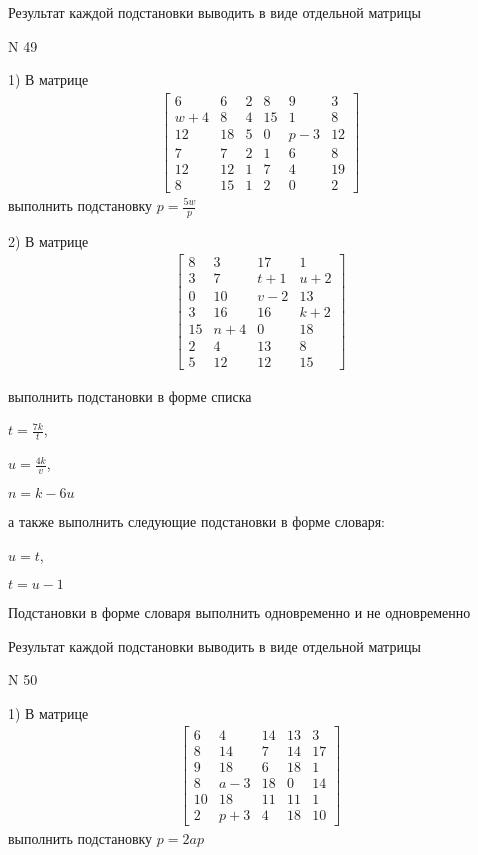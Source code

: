 \documentclass[11pt]{report}
\begin{document}
    Результат каждой подстановки выводить в виде отдельной матрицы

\newpage
N 49


    1) В матрице
\begin{align*}
\left[\begin{matrix}6 & 6 & 2 & 8 & 9 & 3\\w + 4 & 8 & 4 & 15 & 1 & 8\\12 & 18 & 5 & 0 & p - 3 & 12\\7 & 7 & 2 & 1 & 6 & 8\\12 & 12 & 1 & 7 & 4 & 19\\8 & 15 & 1 & 2 & 0 & 2\end{matrix}\right]
\end{align*}
выполнить подстановку $p=\frac{5 w}{p}$


    2) В матрице
\begin{align*}
\left[\begin{matrix}8 & 3 & 17 & 1\\3 & 7 & t + 1 & u + 2\\0 & 10 & v - 2 & 13\\3 & 16 & 16 & k + 2\\15 & n + 4 & 0 & 18\\2 & 4 & 13 & 8\\5 & 12 & 12 & 15\end{matrix}\right]
\end{align*}

выполнить подстановки в форме списка

$t=\frac{7 k}{t}$,

$u=\frac{4 k}{v}$,

$n=k - 6 u$

а также выполнить следующие подстановки в форме словаря:

$u=t$,

$t=u - 1$


    Подстановки в форме словаря выполнить одновременно и не одновременно


    Результат каждой подстановки выводить в виде отдельной матрицы

\newpage
N 50


    1) В матрице
\begin{align*}
\left[\begin{matrix}6 & 4 & 14 & 13 & 3\\8 & 14 & 7 & 14 & 17\\9 & 18 & 6 & 18 & 1\\8 & a - 3 & 18 & 0 & 14\\10 & 18 & 11 & 11 & 1\\2 & p + 3 & 4 & 18 & 10\end{matrix}\right]
\end{align*}
выполнить подстановку $p=2 a p$
\end{document}

